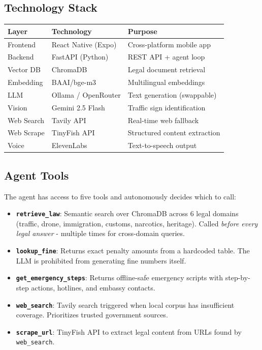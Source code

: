 \documentclass[conference, onecolumn]{IEEEtran}
\begin{document}
\subsection{Technology Stack}

\begin{table}[H]
\centering
\begin{tabular}{@{}lll@{}}
\toprule
\textbf{Layer} & \textbf{Technology} & \textbf{Purpose} \\
\midrule
Frontend & React Native (Expo) & Cross-platform mobile app \\
Backend & FastAPI (Python) & REST API + agent loop \\
Vector DB & ChromaDB & Legal document retrieval \\
Embedding & BAAI/bge-m3 & Multilingual embeddings \\
LLM & Ollama / OpenRouter & Text generation (swappable) \\
Vision & Gemini 2.5 Flash & Traffic sign identification \\
Web Search & Tavily API & Real-time web fallback \\
Web Scrape & TinyFish API & Structured content extraction \\
Voice & ElevenLabs & Text-to-speech output \\
\bottomrule
\end{tabular}
\end{table}

\subsection{Agent Tools}

The agent has access to five tools and autonomously decides which to call:

\begin{itemize}[leftmargin=*]
    \item \textbf{\texttt{retrieve\_law}}: Semantic search over ChromaDB across 6 legal domains (traffic, drone, immigration, customs, narcotics, heritage). Called \textit{before every legal answer} - multiple times for cross-domain queries.
    \item \textbf{\texttt{lookup\_fine}}: Returns exact penalty amounts from a hardcoded table. The LLM is prohibited from generating fine numbers itself.
    \item \textbf{\texttt{get\_emergency\_steps}}: Returns offline-safe emergency scripts with step-by-step actions, hotlines, and embassy contacts.
    \item \textbf{\texttt{web\_search}}: Tavily search triggered when local corpus has insufficient coverage. Prioritizes trusted government sources.
    \item \textbf{\texttt{scrape\_url}}: TinyFish API to extract legal content from URLs found by \texttt{web\_search}.
\end{itemize}
\end{document}
